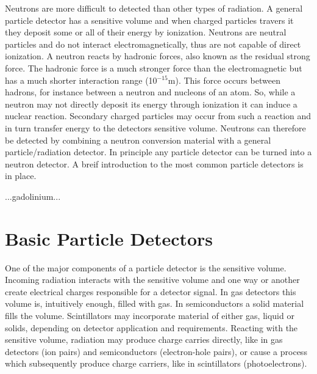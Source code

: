 
Neutrons are more difficult to detected than other types of radiation. A general particle detector has a sensitive volume and when charged particles travers it they deposit some or all of their energy by ionization. Neutrons are neutral particles and do not interact electromagnetically, thus are not capable of direct ionization. A neutron reacts by hadronic forces, also known as the residual strong force. The hadronic force is a much stronger force than the electromagnetic but has a much shorter interaction range (10$^{-15}$m).  This force occurs between hadrons, for instance between a neutron and nucleons of an atom. So, while a neutron may not directly deposit its energy through ionization it can induce a nuclear reaction.  Secondary charged particles may occur from such a reaction and in turn transfer energy to the detectors sensitive volume. Neutrons can therefore be detected by combining a neutron conversion material with a general particle/radiation detector.
In principle any particle detector can be turned into a neutron detector.
A breif introduction to the most common particle detectors is in place. %

...gadolinium...

\section{Basic Particle Detectors}
One of the major components of a particle detector is the sensitive volume. Incoming radiation interacts with the sensitive volume and one way or another create electrical charges responsible for a detector signal. In gas detectors this volume is, intuitively enough, filled with gas. In semiconductors a solid material fills the volume. Scintillators may incorporate material of either gas, liquid or solids, depending on detector application and requirements. Reacting with the sensitive volume, radiation may produce charge carries directly, like in gas detectors (ion pairs) and semiconductors (electron-hole pairs), or cause a process which subsequently produce charge carriers, like in scintillators (photoelectrons).

